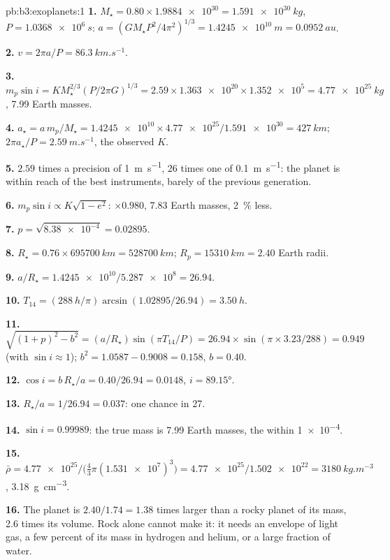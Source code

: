 \begin{solution}{pb:b3:exoplanets:1}
\textbf{1.} $M_\star = 0.80\times\num{1.9884e30} = \qty{1.591e30}{kg}$, $P =
\qty{1.0368e6}{s}$: $a = (GM_\star P^2/4\pi^2)^{1/3} = \qty{1.4245e10}{m}
= \qty{0.0952}{au}$.

\textbf{2.} $v = 2\pi a/P = \qty{86.3}{km.s^{-1}}$.

\textbf{3.} $m_p\sin i = KM_\star^{2/3}(P/2\pi G)^{1/3} = 2.59\times\num{1.363e20}
\times\num{1.352e5} = \qty{4.77e25}{kg}$, \num{7.99} Earth masses.

\textbf{4.} $a_\star = a\,m_p/M_\star = \num{1.4245e10}\times\num{4.77e25}/
\num{1.591e30} = \qty{427}{km}$; $2\pi a_\star/P = \qty{2.59}{m.s^{-1}}$,
the observed $K$.

\textbf{5.} $2.59$ times a precision of \qty{1}{m.s^{-1}}, 26 times one of
\qty{0.1}{m.s^{-1}}: the planet is within reach of the best instruments,
barely of the previous generation.

\textbf{6.} $m_p\sin i \propto K\sqrt{1 - e^2}$: $\times0.980$, 7.83 Earth
masses, \qty{2}{\percent} less.

\textbf{7.} $p = \sqrt{\num{8.38e-4}} = 0.02895$.

\textbf{8.} $R_\star = 0.76\times\qty{695700}{km} = \qty{528700}{km}$; $R_p =
\qty{15310}{km} = 2.40$ Earth radii.

\textbf{9.} $a/R_\star = \num{1.4245e10}/\num{5.287e8} = 26.94$.

\textbf{10.} $T_{14} = (\qty{288}{h}/\pi)\arcsin(1.02895/26.94) = \qty{3.50}{h}$.

\textbf{11.} $\sqrt{(1 + p)^2 - b^2} = (a/R_\star)\sin(\pi T_{14}/P) = 26.94\times
\sin(\pi\times3.23/288) = 0.949$ (with $\sin i \approx 1$); $b^2 =
1.0587 - 0.9008 = 0.158$, $b = 0.40$.

\textbf{12.} $\cos i = b\,R_\star/a = 0.40/26.94 = 0.0148$, $i = \ang{89.15}$.

\textbf{13.} $R_\star/a = 1/26.94 = 0.037$: one chance in 27.

\textbf{14.} $\sin i = 0.99989$: the true mass is 7.99 Earth masses, the  within \num{1e-4}.

\textbf{15.} $\bar\rho = \num{4.77e25}/\bigl(\tfrac43\pi(\num{1.531e7})^3\bigr) =
\num{4.77e25}/\num{1.502e22} = \qty{3180}{kg.m^{-3}}$,
\qty{3.18}{g.cm^{-3}}.

\textbf{16.} The planet is $2.40/1.74 = 1.38$ times larger than a rocky planet of
its mass, 2.6 times its volume. Rock alone cannot make it: it needs an
envelope of light gas, a few percent of its mass in hydrogen and helium,
or a large fraction of water.


\end{solution}
